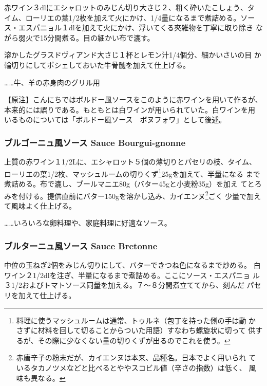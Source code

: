 \documentclass[twoside,12Q,b5paper]{escoffierltjsbook}
\newenvironment{recette}{\begin{small}\begin{spacing}{1}\begin{multicols}{2}}{\end{multicols}\end{spacing}\end{small}}
\begin{document}
\begin{recette}
赤ワイン３dlにエシャロットのみじん切り大さじ２、粗く砕いたこしょう、タ
イム、ローリエの葉1/2枚を加えて火にかけ、1/4量になるまで煮詰める。ソー
ス・エスパニョル１dlを加えて火にかけ、浮いてくる夾雑物を丁寧に取り除き
ながら弱火で15分間煮る。目の細かい布で漉す。

溶かしたグラスドヴィアンド大さじ１杯とレモン汁1/4個分、細かいさいの目
か輪切りにしてポシェしておいた牛骨髄を加えて仕上げる。

\ldots{}\ldots{}牛、羊の赤身肉のグリル用

【原注】こんにちではボルドー風ソースをこのように赤ワインを用いて作るが、
本来的には誤りである。もともとは白ワインが用いられていた。白ワインを用
いるものについては「ボルドー風ソース　ボヌフォワ」として後述。

\subsubsection*{ブルゴーニュ風ソース Sauce
Bourgui-gnonne}\label{ux30d6ux30ebux30b4ux30fcux30cbux30e5ux98a8ux30bdux30fcux30b9-sauce-bourgui-gnonne}

上質の赤ワイン１1/2Lに、エシャロット５個の薄切りとパセリの枝、タイム、
ローリエの葉1/2枚、マッシュルームの切りくず\footnote{料理に使うマッシュルームは通常、トゥルネ（包丁を持った側の手は動
  かさずに材料を回して切ることからついた用語）すなわち螺旋状に切って
  供するが、その際に少なくない量の切りくずが出るのでこれを使う。}25gを加えて、半量になる
まで煮詰める。布で漉し、ブールマニエ80g（バター45gと小麦粉35g）を加え
てとろみを付ける。提供直前にバター150gを溶かし込み、カイエンヌ\footnote{赤唐辛子の粉末だが、カイエンヌは本来、品種名。日本でよく用いられ
  ているタカノツメなどと比べるとややスコビル値（辛さの指数）は低く、
  風味も異なる。}ごく 少量で加えて風味よく仕上げる。

\ldots{}\ldots{}いろいろな卵料理や、家庭料理に好適なソース。

\subsubsection*{ブルターニュ風ソース Sauce
Bretonne}\label{ux30d6ux30ebux30bfux30fcux30cbux30e5ux98a8ux30bdux30fcux30b9-sauce-bretonne}

中位の玉ねぎ2個をみじん切りにして、バターできつね色になるまで炒める。
白ワイン２1/2dlを注ぎ、半量になるまで煮詰める。ここにソース・エスパニョ
ル３1/2およびトマトソース同量を加える。７〜８分間煮立ててから、刻んだ
パセリを加えて仕上げる。


\end{recette}
\end{document}

